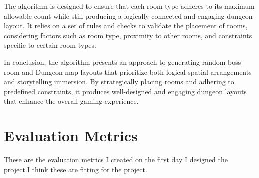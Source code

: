 \documentclass[10pt,twocolumn]{article}
\begin{document}
The algorithm is designed to ensure that each room type adheres to its maximum allowable count while still producing a logically connected and engaging dungeon layout. It relies on a set of rules and checks to validate the placement of rooms, considering factors such as room type, proximity to other rooms, and constraints specific to certain room types.

In conclusion, the algorithm presents an approach to generating random boss room and  Dungeon map layouts that prioritize both logical spatial arrangements and storytelling immersion. By strategically placing rooms and adhering to predefined constraints, it produces well-designed and engaging dungeon layouts that enhance the overall gaming experience.

\section{Evaluation Metrics}

These are the evaluation metrics I created on the first day I designed the project.I think these are fitting for the project.
\end{document}
